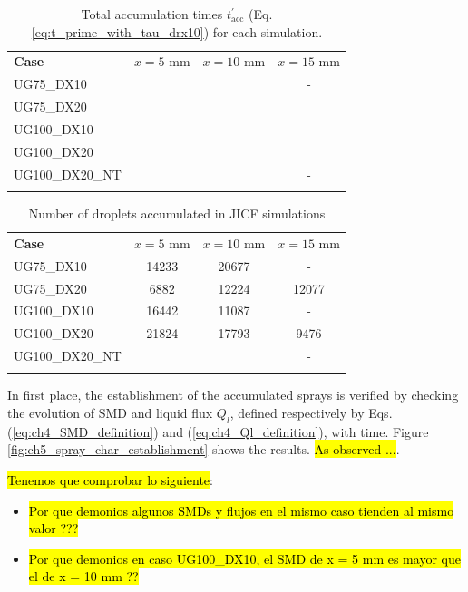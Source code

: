 \begin{table}[!h]
\centering
\caption{Total accumulation times $t_\mathrm{acc}^{\prime}$ (Eq. \ref{eq:t_prime_with_tau_drx10}) for each simulation.}
\begin{tabular}{lccc}
\thickhline
\textbf{Case} & $x = 5$ mm & $x = 10$ mm & $x = 15$ mm  \\
\thickhline 
UG75\_DX10  &  &  & - \\
UG75\_DX20  &   &  &   \\
UG100\_DX10 &  &  & - \\
UG100\_DX20 &  &  &   \\
UG100\_DX20\_NT &  & & - \\
\thickhline
\end{tabular}
\label{tab:jicf_SLI_t_prime_accumulation}
\end{table}


\begin{table}[!h]
\centering
\caption{Number of droplets accumulated in JICF simulations}
\begin{tabular}{lccc}
\thickhline
\textbf{Case} & $x = 5$ mm & $x = 10$ mm & $x = 15$ mm  \\
\thickhline 
UG75\_DX10  & 14233 & 20677 & - \\
UG75\_DX20  &  6882 & 12224 & 12077 \\
UG100\_DX10 & 16442 & 11087 & - \\
UG100\_DX20 & 21824 & 17793 & 9476 \\
UG100\_DX20\_NT &  & & - \\
\thickhline
\end{tabular}
\label{tab:jicf_SLI_Ndr_accumulated}
\end{table}

In first place, the establishment of the accumulated sprays is verified by checking the evolution of SMD and liquid flux $Q_l$, defined respectively by Eqs. (\ref{eq:ch4_SMD_definition}) and (\ref{eq:ch4_Ql_definition}), with time. Figure \ref{fig:ch5_spray_char_establishment} shows the results. \hl{As observed ...}.

\hl{Tenemos que comprobar lo siguiente}:

\begin{itemize}

	\item \hl{Por que demonios algunos SMDs y flujos en el mismo caso tienden al mismo valor ???}
	
	\item \hl{Por que demonios en caso UG100\_DX10, el SMD de x = 5 mm es mayor que el de x = 10 mm ??}

\end{itemize}

